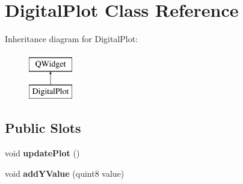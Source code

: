 \hypertarget{class_digital_plot}{}\section{Digital\+Plot Class Reference}
\label{class_digital_plot}
Inheritance diagram for Digital\+Plot\+:\begin{figure}[H]
\begin{center}
\leavevmode
\includegraphics[height=2.000000cm]{class_digital_plot}
\end{center}
\end{figure}
\subsection*{Public Slots}
\begin{DoxyCompactItemize}
\item 
\mbox{\label{class_digital_plot_a64f9ee7cd74c69b0a98450e454083d90}} 
void {\bfseries update\+Plot} ()
\item 
\mbox{\label{class_digital_plot_ad1ad1e3ffc53e202800cf84f50c937b1}} 
void {\bfseries add\+Y\+Value} (quint8 value)
\end{DoxyCompactItemize}
